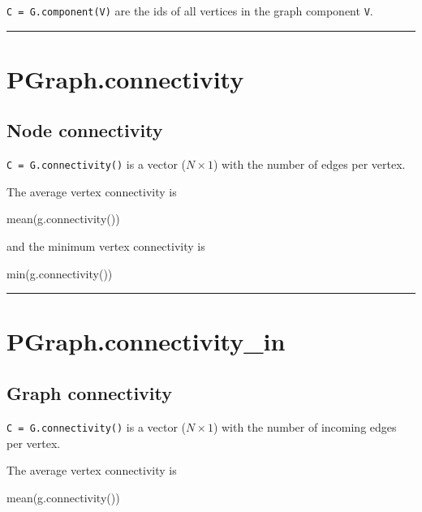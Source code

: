 \texttt{C = G.component(V)} are the ids of all vertices in the graph component \texttt{V}.

\vspace{1.5ex}\hrule

\hypertarget{PGraph.connectivity}{\section*{PGraph.connectivity}}
\subsection*{Node connectivity}


\texttt{C = G.connectivity()} is a vector ($N \times 1$) with the number of edges per
vertex.



The average vertex connectivity is

\begin{Code}
   mean(g.connectivity())

\end{Code}


and the minimum vertex connectivity is

\begin{Code}
   min(g.connectivity())

\end{Code}
\vspace{1.5ex}\hrule

\hypertarget{PGraph.connectivity\_in}{\section*{PGraph.connectivity\_in}}
\subsection*{Graph connectivity}


\texttt{C = G.connectivity()} is a vector ($N \times 1$) with the number of incoming edges per
vertex.



The average vertex connectivity is

\begin{Code}
   mean(g.connectivity())

\end{Code}


